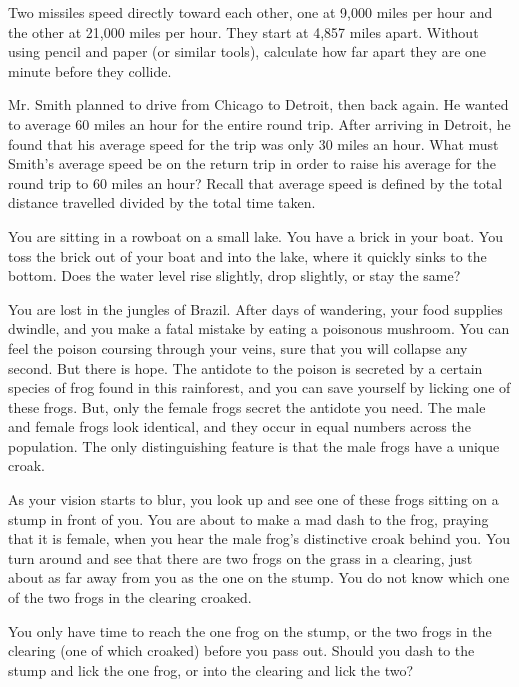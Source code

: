 \documentclass[12pt]{article}
\begin{document}
    \begin{exercise}
        Two missiles speed directly toward each other, one at 9,000 miles per hour and the other at 21,000 miles per hour. They start at 4,857 miles apart. Without using pencil and paper (or similar tools), calculate how far apart they are one minute before they collide.
    \end{exercise}
    
    \begin{exercise}
        Mr. Smith planned to drive from Chicago to Detroit, then back again. He wanted to average 60 miles an hour for the entire round trip. After arriving in Detroit, he found that his average speed for the trip was only 30 miles an hour. What must Smith's average speed be on the return trip in order to raise his average for the round trip to 60 miles an hour? Recall that average speed is defined by the total distance travelled divided by the total time taken.
    \end{exercise}
    
    \begin{exercise}
        You are sitting in a rowboat on a small lake. You have a brick in your boat. You toss the brick out of your boat and into the lake, where it quickly sinks to the bottom. Does the water level rise slightly, drop slightly, or stay the same?
    \end{exercise}
    
    \begin{exercise}
        You are lost in the jungles of Brazil. After days of wandering, your food supplies dwindle, and you make a fatal mistake by eating a poisonous mushroom. You can feel the poison coursing through your veins, sure that you will collapse any second. But there is hope. The antidote to the poison is secreted by a certain species of frog found in this rainforest, and you can save yourself by licking one of these frogs. But, only the female frogs secret the antidote you need. The male and female frogs look identical, and they occur in equal numbers across the population. The only distinguishing feature is that the male frogs have a unique croak.

        As your vision starts to blur, you look up and see one of these frogs sitting on a stump in front of you. You are about to make a mad dash to the frog, praying that it is female, when you hear the male frog's distinctive croak behind you. You turn around and see that there are two frogs on the grass in a clearing, just about as far away from you as the one on the stump. You do not know which one of the two frogs in the clearing croaked.

        You only have time to reach the one frog on the stump, or the two frogs in the clearing (one of which croaked) before you pass out. Should you dash to the stump and lick the one frog, or into the clearing and lick the two?
    \end{exercise}
    
\end{document}
